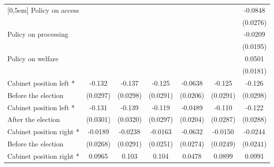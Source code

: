 \begin{table}[!ht]
\begin{tabular}{l*{6}{c}}
[0,5em]
Policy on access    &                     &                     &                     &                     &                     &     -0.0848\sym{**} \\
                    &                     &                     &                     &                     &                     &    (0.0276)         \\
[0,5em]
Policy on processing&                     &                     &                     &                     &                     &     -0.0209         \\
                    &                     &                     &                     &                     &                     &    (0.0195)         \\
[0,5em]
Policy on welfare   &                     &                     &                     &                     &                     &      0.0501\sym{**} \\
                    &                     &                     &                     &                     &                     &    (0.0181)         \\
[0,5em]
Cabinet position left *&      -0.132\sym{***}&      -0.137\sym{***}&      -0.125\sym{***}&     -0.0638\sym{**} &      -0.125\sym{***}&      -0.126\sym{***}\\
 Before the election                    &    (0.0297)         &    (0.0298)         &    (0.0291)         &    (0.0206)         &    (0.0291)         &    (0.0298)         \\
[0,5em]
Cabinet position left *&      -0.131\sym{***}&      -0.139\sym{***}&      -0.119\sym{***}&     -0.0489\sym{*}  &      -0.110\sym{***}&      -0.122\sym{***}\\
 After the election                    &    (0.0301)         &    (0.0320)         &    (0.0297)         &    (0.0204)         &    (0.0287)         &    (0.0288)         \\
[0,5em]
Cabinet position right *&     -0.0189         &     -0.0238         &     -0.0163         &     -0.0632\sym{*}  &     -0.0150         &     -0.0244         \\
 Before the election                    &    (0.0268)         &    (0.0291)         &    (0.0251)         &    (0.0274)         &    (0.0249)         &    (0.0241)         \\
[0,5em]
Cabinet position right *&      0.0965\sym{***}&       0.103\sym{***}&       0.104\sym{***}&      0.0478         &      0.0899\sym{***}&      0.0991\sym{***}\\

\end{tabular}
\end{table}
